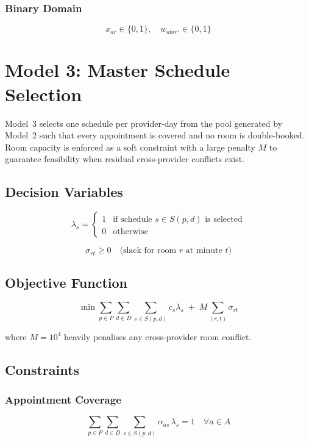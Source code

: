 \documentclass[12pt]{article}
\begin{document}
\subsubsection*{Binary Domain}

\[
x_{ar} \in \{0,1\}, \quad w_{ab r r'} \in \{0,1\}
\]

\newpage

\section{Model 3: Master Schedule Selection}

Model~3 selects one schedule per provider-day from the pool generated by Model~2
such that every appointment is covered and no room is double-booked.
Room capacity is enforced as a soft constraint with a large penalty $M$ to guarantee
feasibility when residual cross-provider conflicts exist.

\subsection*{Decision Variables}

\[
\lambda_s =
\begin{cases}
1 & \text{if schedule } s \in S(p,d) \text{ is selected} \\
0 & \text{otherwise}
\end{cases}
\]

\[
\sigma_{rt} \ge 0 \quad \text{(slack for room } r \text{ at minute } t\text{)}
\]

\subsection*{Objective Function}

\[
\min \sum_{p \in P} \sum_{d \in D} \sum_{s \in S(p,d)} c_s \lambda_s
\;+\;
M \sum_{(r,t)} \sigma_{rt}
\]

where $M = 10^{4}$ heavily penalises any cross-provider room conflict.

\subsection*{Constraints}

\subsubsection*{Appointment Coverage}

\[
\sum_{p \in P}\sum_{d \in D} \sum_{s \in S(p,d)} \alpha_{as}\,\lambda_s = 1
\quad \forall a \in A
\]
\end{document}
